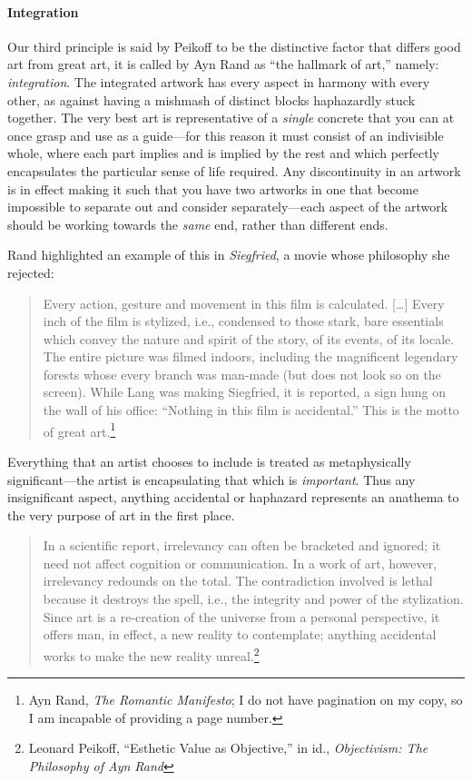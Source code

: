 \documentclass[11pt]{article}
\begin{document}
\paragraph*{Integration}
\label{sec:org93417ff}
Our third principle is said by Peikoff to be the distinctive factor that differs good art from great art, it is called by Ayn Rand as ``the hallmark of art,'' namely: \emph{integration}. The integrated artwork has every aspect in harmony with every other, as against having a mishmash of distinct blocks haphazardly stuck together. The very best art is representative of a \emph{single} concrete that you can at once grasp and use as a guide---for this reason it must consist of an indivisible whole, where each part implies and is implied by the rest and which perfectly encapsulates the particular sense of life required. Any discontinuity in an artwork is in effect making it such that you have two artworks in one that become impossible to separate out and consider separately---each aspect of the artwork should be working towards the \emph{same} end, rather than different ends.

Rand highlighted an example of this in \emph{Siegfried}, a movie whose philosophy she rejected:
\begin{quote}
Every action, gesture and movement in this film is calculated. [\ldots{}] Every inch of the film is stylized, i.e., condensed to those stark, bare essentials which convey the nature and spirit of the story, of its events, of its locale. The entire picture was filmed indoors, including the magnificent legendary forests whose every branch was man-made (but does not look so on the screen). While Lang was making Siegfried, it is reported, a sign hung on the wall of his office: ``Nothing in this film is accidental.'' This is the motto of great art.\footnote{Ayn Rand, \emph{The Romantic Manifesto}; I do not have pagination on my copy, so I am incapable of providing a page number.}
\end{quote}

Everything that an artist chooses to include is treated as metaphysically significant---the artist is encapsulating that which is \emph{important}. Thus any insignificant aspect, anything accidental or haphazard represents an anathema to the very purpose of art in the first place.

\begin{quote}
In a scientific report, irrelevancy can often be bracketed and ignored; it need not affect cognition or communication. In a work of art, however, irrelevancy redounds on the total. The contradiction involved is lethal because it destroys the spell, i.e., the integrity and power of the stylization. Since art is a re-creation of the universe from a personal perspective, it offers man, in effect, a new reality to contemplate; anything accidental works to make the new reality unreal.\footnote{Leonard Peikoff, ``Esthetic Value as Objective,'' in id., \emph{Objectivism: The Philosophy of Ayn Rand}}
\end{quote}
\end{document}

